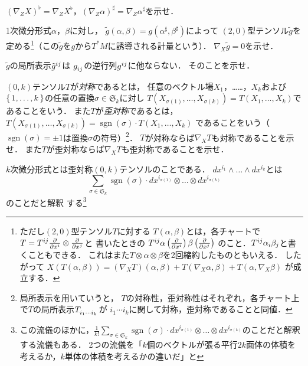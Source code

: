 \documentclass[uplatex,dvipdfmx,fontsize=12pt,jafontsize=11pt,line_length=42zw,number_of_lines=36,hanging_punctuation]{jlreq}
\DeclareMathOperator{\sgn}{sgn}
\begin{document}
\begin{problems}
\begin{subproblems}
				$(\nabla_ZX)^\flat=\nabla_ZX^\flat$，$(\nabla_Z\alpha)^\sharp=\nabla_Z\alpha^\sharp$を示せ．
			\item[(2)]
				1次微分形式$\alpha$，$\beta$に対し，
				$\tilde{g}(\alpha,\beta)=g(\alpha^\sharp,\beta^\sharp)$によって
				$(2,0)$型テンソル$\tilde{g}$を定める\footnote{ただし$(2,0)$型テンソル$T$に対する
				$T(\alpha,\beta)$とは，各チャートで
				$T=\tensor{T}{^i^j}\frac{\partial}{\partial x^i}\otimes\frac{\partial}{\partial x^j}$と
				書いたときの
				$\tensor{T}{^i^j}\alpha\left(\frac{\partial}{\partial x^i}\right)
				\beta\left(\frac{\partial}{\partial x^j}\right)$
				のこと．$\tensor{T}{^i^j}\alpha_i\beta_j$と書くこともできる．
				これはまた$T\otimes\alpha\otimes\beta$を2回縮約したものともいえる．
				したがって
				$X(T(\alpha,\beta))=(\nabla_XT)(\alpha,\beta)+T(\nabla_X\alpha,\beta)+T(\alpha,\nabla_X\beta)$
				が成立する．}（この$\tilde{g}$を$g$から$T^*M$に誘導される計量という）．
				$\nabla_X\tilde{g}=0$を示せ．
			\item[(3)]
				$\tilde{g}$の局所表示$\tensor{\tilde{g}}{^i^j}$は
				$\tensor{g}{_i_j}$の逆行列$\tensor{g}{^i^j}$に他ならない．
				そのことを示せ．
		\end{subproblems}
	\item[4.4]
		$(0,k)$テンソル$T$が\emph{対称}であるとは，
		任意のベクトル場$X_1$，……，$X_k$および
		$\set{1,\dots,k}$の任意の置換$\sigma\in\mathfrak{S}_k$に対し
		$T(X_{\sigma(1)},\dots,X_{\sigma(k)})=T(X_1,\dots,X_k)$であることをいう．
		また$T$が\emph{歪対称}であるとは，
		$T(X_{\sigma(1)},\dots,X_{\sigma(k)})=\sgn(\sigma)\cdot T(X_1,\dots,X_k)$
		であることをいう（$\sgn(\sigma)=\pm 1$は置換$\sigma$の符号）\footnote{局所表示を用いていうと，
		$T$の対称性，歪対称性はそれぞれ，各チャート上で$T$の局所表示$\tensor{T}{_{i_1}_{\cdots}_{i_k}}$が
		$i_1\cdots i_k$に関して対称，歪対称であることと同値．}．
		$T$が対称ならば$\nabla_XT$も対称であることを示せ．
		また$T$が歪対称ならば$\nabla_XT$も歪対称であることを示せ．
	\item[4.5]
		$k$次微分形式とは歪対称$(0,k)$テンソルのことである．
		$dx^{i_1}\wedge\dots\wedge dx^{i_k}$とは
		\begin{equation}
			\sum_{\sigma\in\mathfrak{S}_k}\sgn(\sigma)\cdot dx^{i_{\sigma(1)}}\otimes\dots\otimes dx^{i_{\sigma(k)}}
		\end{equation}
		のことだと解釈
		する\footnote{この流儀のほかに，$\displaystyle\frac{1}{k!}\sum_{\sigma\in\mathfrak{S}_k}
		\sgn(\sigma)\cdot dx^{i_{\sigma(1)}}\otimes\dots\otimes dx^{i_{\sigma(k)}}$のことだと解釈する流儀もある．
		2つの流儀を「$k$個のベクトルが張る平行$2k$面体の体積を考えるか，$k$単体の体積を考えるかの違いだ」と
}
\end{problems}
\end{document}
